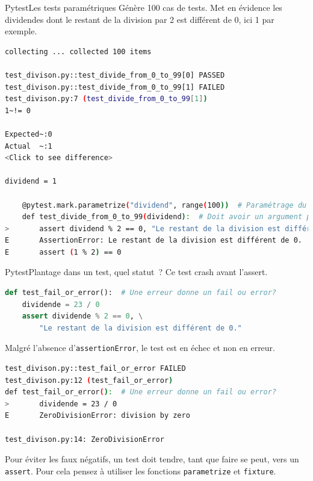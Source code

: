 \documentclass{beamer}
\begin{document}
    \begin{frame}[fragile]{Pytest}{Les tests paramétriques}
        \transdissolve
        Génère 100 cas de tests.
        Met en évidence les dividendes dont le restant de la division par 2 est différent de 0, ici 1 par exemple.
        \begin{lstlisting}[language=sh]
collecting ... collected 100 items

test_divison.py::test_divide_from_0_to_99[0] PASSED                      [  1%]
test_divison.py::test_divide_from_0_to_99[1] FAILED                      [  2%]
test_divison.py:7 (test_divide_from_0_to_99[1])
1~!= 0

Expected~:0
Actual  ~:1
<Click to see difference>

dividend = 1

    @pytest.mark.parametrize("dividend", range(100))  # Paramétrage du test
    def test_divide_from_0_to_99(dividend):  # Doit avoir un argument présent dans le paramétrage
>       assert dividend % 2 == 0, "Le restant de la division est différent de 0."
E       AssertionError: Le restant de la division est différent de 0.
E       assert (1 % 2) == 0
        \end{lstlisting}
    \end{frame}

    \begin{frame}[fragile]{Pytest}{Plantage dans un test, quel statut~?}
        \transdissolve
        Ce test crash avant l'assert.
        \begin{lstlisting}[language=Python]
def test_fail_or_error():  # Une erreur donne un fail ou error?
    dividende = 23 / 0
    assert dividende % 2 == 0, \
        "Le restant de la division est différent de 0."
        \end{lstlisting}
        Malgré l'absence d'\lstinline{assertionError}, le test est en échec et non en erreur.
        \begin{lstlisting}[language=sh]
test_divison.py::test_fail_or_error FAILED                               [100%]
test_divison.py:12 (test_fail_or_error)
def test_fail_or_error():  # Une erreur donne un fail ou error?
>       dividende = 23 / 0
E       ZeroDivisionError: division by zero

test_divison.py:14: ZeroDivisionError
        \end{lstlisting}

        \begin{dangercolorbox}
            Pour éviter les faux négatifs, un test doit tendre, tant que faire se peut, vers un \lstinline{assert}.
            Pour cela pensez à utiliser les fonctions \lstinline{parametrize} et \lstinline{fixture}.
        \end{dangercolorbox}
    \end{frame}
\end{document}
